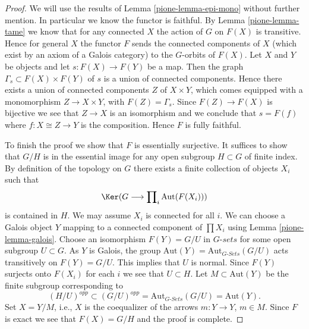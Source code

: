 \begin{proof}

We will use the results of Lemma \ref{pione-lemma-epi-mono} without further mention.
In particular we know the functor is faithful.
By Lemma \ref{pione-lemma-tame} we know that for any connected $X$ the
action of $G$ on $F(X)$ is transitive. Hence for general $X$ the functor
$F$ sends the connected components of $X$ (which exist by
an axiom of a Galois category) to the $G$-orbits of $F(X)$.
Let $X$ and $Y$ be objects and let
$s : F(X) \to F(Y)$ be a map. Then the graph
$\Gamma_s \subset F(X) \times F(Y)$ of $s$
is a union of connected components. Hence there exists a
union of connected components $Z$ of $X \times Y$,
which comes equipped with a monomorphism $Z \to X \times Y$,
with $F(Z) = \Gamma_s$. Since $F(Z) \to F(X)$ is bijective
we see that $Z \to X$ is an isomorphism and we conclude
that $s = F(f)$ where $f : X \cong Z \to Y$ is the composition.
Hence $F$ is fully faithful.

\medskip\noindent
To finish the proof we show that $F$ is essentially surjective.
It suffices to show that $G/H$ is in the essential image for
any open subgroup $H \subset G$ of finite index.
By definition of the topology on $G$ there exists a finite
collection of objects $X_i$ such that
$$
\Ker(G \longrightarrow \prod\nolimits_i \text{Aut}(F(X_i)))
$$
is contained in $H$. We may assume $X_i$ is connected
for all $i$. We can choose a Galois object $Y$ mapping
to a connected component of $\prod X_i$ using
Lemma \ref{pione-lemma-galois}. Choose an isomorphism $F(Y) = G/U$
in $G\textit{-sets}$ for some open subgroup $U \subset G$.
As $Y$ is Galois, the group
$\text{Aut}(Y) = \text{Aut}_{G\textit{-Sets}}(G/U)$ acts transitively
on $F(Y) = G/U$. This implies that $U$ is normal. Since
$F(Y)$ surjects onto $F(X_i)$ for each $i$ we see that
$U \subset H$. Let $M \subset \text{Aut}(Y)$ be the finite subgroup
corresponding to
$$
(H/U)^{opp} \subset (G/U)^{opp} = \text{Aut}_{G\textit{-Sets}}(G/U)
= \text{Aut}(Y).
$$
Set $X = Y/M$, i.e., $X$ is the coequalizer
of the arrows $m : Y \to Y$, $m \in M$.
Since $F$ is exact we see that $F(X) = G/H$ and the
proof is complete.
\end{proof}

